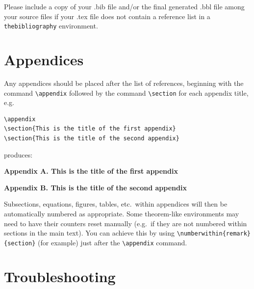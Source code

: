 \documentclass[]{interact}
\theoremstyle{plain}%
\theoremstyle{definition}
\theoremstyle{remark}
\begin{document}
Please include a copy of your .bib file and/or the final generated .bbl file among your source files if your .tex file does not contain a reference list in a \texttt{thebibliography} environment.


\section{Appendices}

Any appendices should be placed after the list of references, beginning with the command \verb"\appendix" followed by the command \verb"\section" for each appendix title, e.g.
\begin{verbatim}
\appendix
\section{This is the title of the first appendix}
\section{This is the title of the second appendix}
\end{verbatim}
produces:\medskip

\noindent\textbf{Appendix A. This is the title of the first appendix}\medskip

\noindent\textbf{Appendix B. This is the title of the second appendix}\medskip

\noindent Subsections, equations, figures, tables, etc.\ within appendices will then be automatically numbered as appropriate. Some theorem-like environments may need to have their counters reset manually (e.g.\ if they are not numbered within sections in the main text). You can achieve this by using \verb"\numberwithin{remark}{section}" (for example) just after the \verb"\appendix" command.


\appendix

\section{Troubleshooting}
\end{document}
